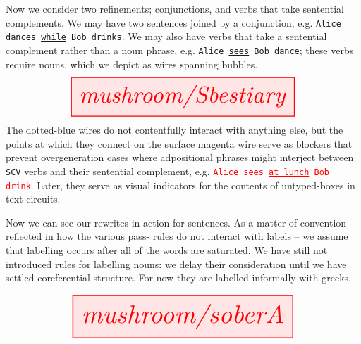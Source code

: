 \begin{myboxB}
\begin{rules}\label{rules:comp}
Now we consider two refinements; conjunctions, and verbs that take sentential complements. We may have two sentences joined by a conjunction, e.g. \texttt{Alice dances \underline{while} Bob drinks}. We may also have verbs that take a sentential complement rather than a noun phrase, e.g. \texttt{Alice \underline{sees} Bob dance}; these verbs require nouns, which we depict as wires spanning bubbles.
\[
\resizebox{0.75\textwidth}{!}{\tikzfig{mushroom/Sbestiary}}
\]
The dotted-blue wires do not contentfully interact with anything else, but the points at which they connect on the surface magenta wire serve as blockers that prevent overgeneration cases where adpositional phrases might interject between \texttt{SCV} verbs and their sentential complement, e.g. \textcolor{red}{\texttt{Alice sees \underline{at lunch} Bob drink}}. Later, they serve as visual indicators for the contents of untyped-boxes in text circuits.
\end{rules}
\end{myboxB}
\clearpage

\begin{myboxR}
\begin{example}\label{ex:soberA}
Now we can see our rewrites in action for sentences. As a matter of convention -- reflected in how the various pass- rules do not interact with labels -- we assume that labelling occurs after all of the words are saturated. We have still not introduced rules for labelling nouns: we delay their consideration until we have settled coreferential structure. For now they are labelled informally with greeks.
\end{example}
\[
\resizebox{0.75\textwidth}{!}{\tikzfig{mushroom/soberA}}
\]
\end{myboxR}
\clearpage

